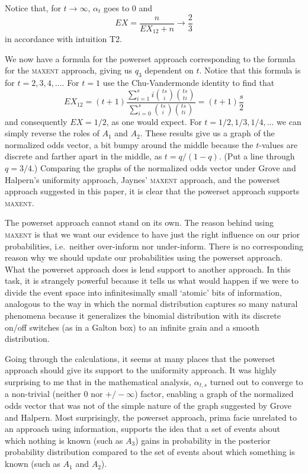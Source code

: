 \documentclass[11pt]{article}
\newcommand{\qnull}[1]{`#1'}
\begin{document}
Notice that, for $t\rightarrow\infty$, $\alpha_{t}$ goes to $0$ and
\begin{displaymath}
  EX=\frac{n}{EX_{12}+n}\rightarrow\frac{2}{3}
\end{displaymath}
in accordance with intuition T2.

We now have a formula for the powerset approach corresponding to the
formula for the \textsc{maxent} approach, giving us $q_{3}$ dependent
on $t$. Notice that this formula is for $t=2,3,4,\ldots$. For $t=1$
use the Chu-Vandermonde identity to find that
\begin{displaymath}
  EX_{12}=(t+1)\frac{\sum_{i=1}^{s}i\binom{ts}{i}\binom{ts}{ti}}{\sum_{i=0}^{s}\binom{ts}{i}\binom{ts}{ti}}=(t+1)\frac{s}{2}  
\end{displaymath}
and consequently $EX=1/2$, as one would expect. For
$t=1/2,1/3,1/4,\ldots$ we can simply reverse the roles of $A_{1}$ and
$A_{2}$. These results give us a graph of the normalized odds vector,
a bit bumpy around the middle because the $t$-values are discrete and
farther apart in the middle, as $t=q/(1-q)$. (Put a line through
$q=3/4$.) Comparing the graphs of the normalized odds vector under
Grove and Halpern's uniformity approach, Jaynes' \textsc{maxent}
approach, and the powerset approach suggested in this paper, it is
clear that the powerset approach supports \textsc{maxent}.

The powerset approach cannot stand on its own. The reason behind using
\textsc{maxent} is that we want our evidence to have just the right
influence on our prior probabilities, i.e.\ neither over-inform nor
under-inform. There is no corresponding reason why we should update
our probabilities using the powerset approach. What the powerset
approach does is lend support to another approach. In this task, it is
strangely powerful because it tells us what would happen if we were to
divide the event space into infinitesimally small \qnull{atomic} bits
of information, analogous to the way in which the normal distribution
captures so many natural phenomena because it generalizes the binomial
distribution with its discrete on/off switches (as in a Galton box) to
an infinite grain and a smooth distribution.

Going through the calculations, it seems at many places that the
powerset approach should give its support to the uniformity approach.
It was highly surprising to me that in the mathematical analysis,
$\alpha_{t,s}$ turned out to converge to a non-trivial (neither $0$
nor $+/-\infty$) factor, enabling a graph of the normalized
odds vector that was not of the simple nature of the graph suggested
by Grove and Halpern. Most surprisingly, the powerset approach, prima
facie unrelated to an approach using information, supports the idea
that a set of events about which nothing is known (such as $A_{3}$)
gains in probability in the posterior probability distribution
compared to the set of events about which something is known (such as
$A_{1}$ and $A_{2}$). 







\end{document}
